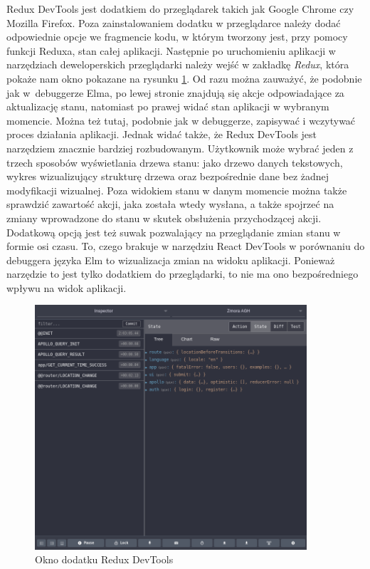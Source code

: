 Redux DevTools jest dodatkiem do przeglądarek takich jak Google Chrome czy Mozilla Firefox. Poza zainstalowaniem dodatku w przeglądarce należy dodać odpowiednie opcje we fragmencie kodu, w którym tworzony jest, przy pomocy funkcji Reduxa, stan całej aplikacji. Następnie po uruchomieniu aplikacji w narzędziach deweloperskich przeglądarki należy wejść w zakładkę \textit{Redux}, która pokaże nam okno pokazane na rysunku \ref{fig:reduxDevTools}. Od razu można zauważyć, że podobnie jak w~debuggerze Elma, po lewej stronie znajdują się akcje odpowiadające za aktualizację stanu, natomiast po prawej widać stan aplikacji w wybranym momencie. Można też tutaj, podobnie jak w debuggerze, zapisywać i wczytywać proces działania aplikacji. Jednak widać także, że Redux DevTools jest narzędziem znacznie bardziej rozbudowanym. Użytkownik może wybrać jeden z trzech sposobów wyświetlania drzewa stanu: jako drzewo danych tekstowych, wykres wizualizujący strukturę drzewa oraz bezpośrednie dane bez żadnej modyfikacji wizualnej. Poza widokiem stanu w danym momencie można także sprawdzić zawartość akcji, jaka została wtedy wysłana, a także spojrzeć na zmiany wprowadzone do stanu w skutek obsłużenia przychodzącej akcji. Dodatkową opcją jest też suwak pozwalający na przeglądanie zmian stanu w formie osi czasu. To, czego brakuje w narzędziu React DevTools w porównaniu do debuggera języka Elm to wizualizacja zmian na widoku aplikacji. Ponieważ narzędzie to jest tylko dodatkiem do przeglądarki, to nie ma ono bezpośredniego wpływu na widok aplikacji.

\begin{figure}[h]
	\centering
	\includegraphics[width=0.9\textwidth]{images/redux_devtools}
	\caption{Okno dodatku Redux DevTools}
	\label{fig:reduxDevTools}
\end{figure}

